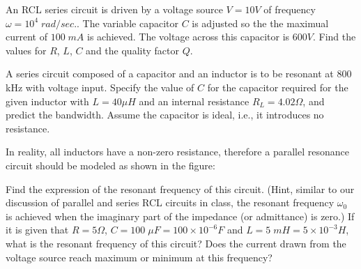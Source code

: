  
\item An RCL series circuit is driven by a voltage source $V=10V$ of
frequency $\omega=10^4 \;rad/sec.$. The variable capacitor $C$ is
adjusted so the the maximual current of $100\;mA$ is achieved. The
voltage across this capacitor is $600V$. Find the values for $R$, $L$,
$C$ and the quality factor $Q$.

% 


\item A series circuit composed of a capacitor and an inductor is to be 
resonant at 800 kHz with voltage input. Specify the value of $C$ for the 
capacitor required for the given inductor with $L=40\mu H$ and an internal 
resistance $R_L=4.02\Omega$, and predict the bandwidth. Assume the capacitor 
is ideal, i.e., it introduces no resistance.



\item In reality, all inductors have a non-zero resistance, therefore a 
parallel resonance circuit should be modeled as shown in the figure:


Find the expression of the resonant frequency of this circuit. (Hint,
similar to our discussion of parallel and series RCL circuits in class, 
the resonant frequency $\omega_0$ is achieved when the imaginary part of
the impedance (or admittance) is zero.) If it is given that $R=5\Omega$,
$C=100\;\mu F=100\times 10^{-6}F$ and $L=5\; mH=5\times 10^{-3}H$, what
is the resonant frequency of this circuit? Does the current drawn from 
the voltage source reach maximum or minimum at this frequency?

